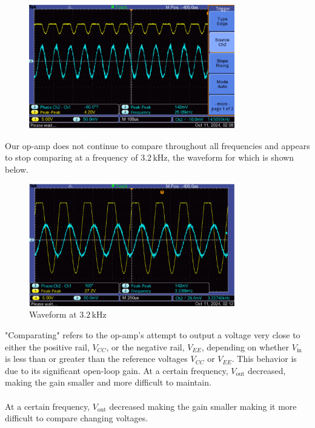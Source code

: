 \documentclass{article}
\begin{document}
\begin{figure}[H]
    \centering
    \includegraphics[width=0.8\textwidth]{img/Lab 7/1_5.png} %
    \caption{}
\end{figure}

Our op-amp does not continue to compare throughout all frequencies and appears to stop
comparing at a frequency of \( 3.2 \, \text{kHz} \), the waveform for which is shown below.

\begin{figure}[H]
    \centering
    \includegraphics[width=0.8\textwidth]{img/Lab 7/1_6.png} %
    \caption{Waveform at \( 3.2 \, \text{kHz} \)}
\end{figure}

"Comparating" refers to the op-amp's attempt to output a voltage very close to either the 
positive rail, \( V_{CC} \), or the negative rail, \( V_{EE} \), depending on 
whether \( V_{\text{in}} \) is less than or greater than the reference voltages \( V_{CC} \) 
or \( V_{EE} \). This behavior is due to its significant open-loop gain. At a certain 
frequency, \( V_{\text{out}} \) decreased, making the gain smaller and more difficult to maintain.
\\ \\
At a certain frequency, \( V_{\text{out}} \) decreased making the gain smaller making it more difficult to
compare changing voltages.
\end{document}
